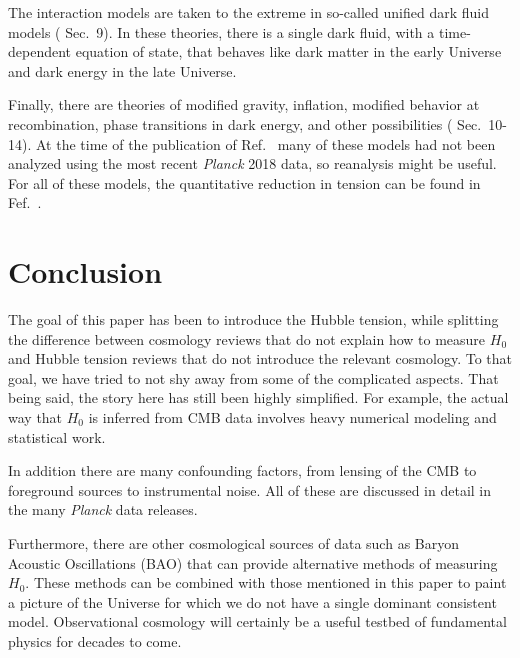 \documentclass[12pt]{article}
\newcommand{\val}[1]{\cite{DiValentino2021} Sec.~#1}
\newcommand{\Planck}[1]{\textit{Planck}}
\begin{document}
The interaction models are taken to the extreme in so-called unified dark fluid models (\val{9}). In these theories, there is a single dark fluid, with a time-dependent equation of state, that behaves like dark matter in the early Universe and dark energy in the late Universe. 

Finally, there are theories of modified gravity, inflation, modified behavior at recombination, phase transitions in dark energy, and other possibilities (\val{10-14}). At the time of the publication of Ref.~\cite{DiValentino2021} many of these models had not been analyzed using the most recent \textit{Planck} 2018 data, so reanalysis might be useful. For all of these models, the quantitative reduction in tension can be found in Fef.~\cite{DiValentino2021}.

\section{Conclusion} \label{sec:concl}

The goal of this paper has been to introduce the Hubble tension, while splitting the difference between cosmology reviews that do not explain how to measure $H_0$ and Hubble tension reviews that do not introduce the relevant cosmology. To that goal, we have tried to not shy away from some of the complicated aspects. That being said, the story here has still been highly simplified. For example, the actual way that $H_0$ is inferred from CMB data involves heavy numerical modeling and statistical work. 

In addition there are many confounding factors, from lensing of the CMB to foreground sources to instrumental noise. All of these are discussed in detail in the many \Planck{} data releases.

Furthermore, there are other cosmological sources of data such as Baryon Acoustic Oscillations (BAO) that can provide alternative methods of measuring $H_0$. These methods can be combined with those mentioned in this paper to paint a picture of the Universe for which we do not have a single dominant consistent model. Observational cosmology will certainly be a useful testbed of fundamental physics for decades to come.



\end{document}

